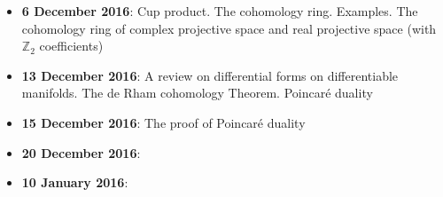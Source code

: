 \documentclass[10pt, twoside=false, x11names]{scrbook}
\newcommand{\Z}{\mathbb{Z}}
\begin{document}
\begin{itemize}
\item \textbf{6 December 2016}: Cup product. The cohomology ring. Examples. The cohomology ring of complex projective space and real projective space (with $ \Z_2 $ coefficients)
\item \textbf{13 December 2016}: A review on differential forms on differentiable manifolds. The de Rham cohomology Theorem. Poincaré duality
\item \textbf{15 December 2016}: The proof of Poincaré duality
\item \textbf{20 December 2016}:
\item \textbf{10 January 2016}:
\end{itemize}


\tableofcontents
{}
\printsymblist






\printindex
\end{document}
